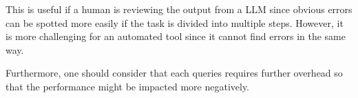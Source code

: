 This is useful if a human is reviewing the output from a \ac{LLM} since obvious errors can be spotted more easily if the task is divided into multiple steps. However, it is more challenging for an automated tool since it cannot find errors in the same way. 

Furthermore, one should consider that each queries requires further overhead so that the performance might be impacted more negatively. 

